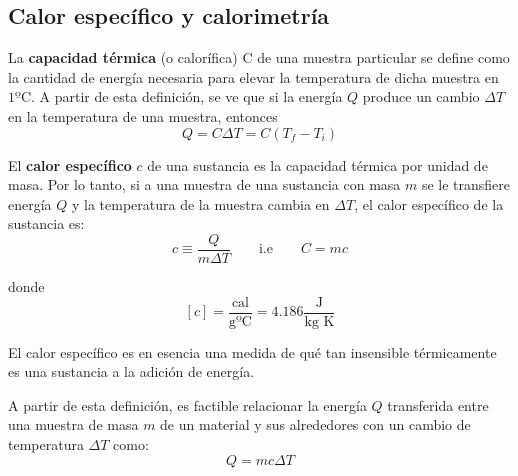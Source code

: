 \subsection{Calor específico y calorimetría}

  \PN La \textbf{capacidad térmica} (o calorífica) C de una muestra particular se define como la cantidad de energía
  necesaria para elevar la temperatura de dicha muestra en $1º$C. A partir de esta definición, se ve que si la energía
  $Q$ produce un cambio $\Delta T$ en la temperatura de una muestra, entonces
  \begin{equation*}
    Q = C \Delta T = C (T_{f} - T_{i})
  \end{equation*}

  \PN El \textbf{calor específico} $c$ de una sustancia es la capacidad térmica por unidad de masa. Por lo tanto, si a
  una muestra de una sustancia con masa $m$ se le transfiere energía $Q$ y la temperatura de la muestra cambia en
  $\Delta T$, el calor específico de la sustancia es:
  \begin{equation*}
    c \equiv \frac{Q}{m \Delta T} \qquad \text{i.e} \qquad C = mc
  \end{equation*}

  \PN donde
  \begin{equation*}
    \left[c\right] = \frac{\text{cal}}{\text{g} º\text{C}} = 4.186 \frac{\text{J}}{\text{kg K}}
  \end{equation*}

  \PN El calor específico es en esencia una medida de qué tan insensible térmicamente es una sustancia a la adición de
  energía.

  \vspace{3mm}
  \PN A partir de esta definición, es factible relacionar la energía $Q$ transferida entre una muestra de masa $m$ de un
  material y sus alrededores con un cambio de temperatura $\Delta T$ como:
  \begin{equation*}
    Q = mc \Delta T
  \end{equation*}
